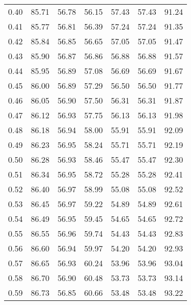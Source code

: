 \begin{tabular}{|c|c|c|c|c|c|c|}
      0.40 &     85.71 &     56.78 &      56.15 &   57.43 &      57.43 &         91.24 \\
      0.41 &     85.77 &     56.81 &      56.39 &   57.24 &      57.24 &         91.35 \\
      0.42 &     85.84 &     56.85 &      56.65 &   57.05 &      57.05 &         91.47 \\
      0.43 &     85.90 &     56.87 &      56.86 &   56.88 &      56.88 &         91.57 \\
      0.44 &     85.95 &     56.89 &      57.08 &   56.69 &      56.69 &         91.67 \\
      0.45 &     86.00 &     56.89 &      57.29 &   56.50 &      56.50 &         91.77 \\
      0.46 &     86.05 &     56.90 &      57.50 &   56.31 &      56.31 &         91.87 \\
      0.47 &     86.12 &     56.93 &      57.75 &   56.13 &      56.13 &         91.98 \\
      0.48 &     86.18 &     56.94 &      58.00 &   55.91 &      55.91 &         92.09 \\
      0.49 &     86.23 &     56.95 &      58.24 &   55.71 &      55.71 &         92.19 \\
      0.50 &     86.28 &     56.93 &      58.46 &   55.47 &      55.47 &         92.30 \\
      0.51 &     86.34 &     56.95 &      58.72 &   55.28 &      55.28 &         92.41 \\
      0.52 &     86.40 &     56.97 &      58.99 &   55.08 &      55.08 &         92.52 \\
      0.53 &     86.45 &     56.97 &      59.22 &   54.89 &      54.89 &         92.61 \\
      0.54 &     86.49 &     56.95 &      59.45 &   54.65 &      54.65 &         92.72 \\
      0.55 &     86.55 &     56.96 &      59.74 &   54.43 &      54.43 &         92.83 \\
      0.56 &     86.60 &     56.94 &      59.97 &   54.20 &      54.20 &         92.93 \\
      0.57 &     86.65 &     56.93 &      60.24 &   53.96 &      53.96 &         93.04 \\
      0.58 &     86.70 &     56.90 &      60.48 &   53.73 &      53.73 &         93.14 \\
      0.59 &     86.73 &     56.85 &      60.66 &   53.48 &      53.48 &         93.22 \\

\end{tabular}
